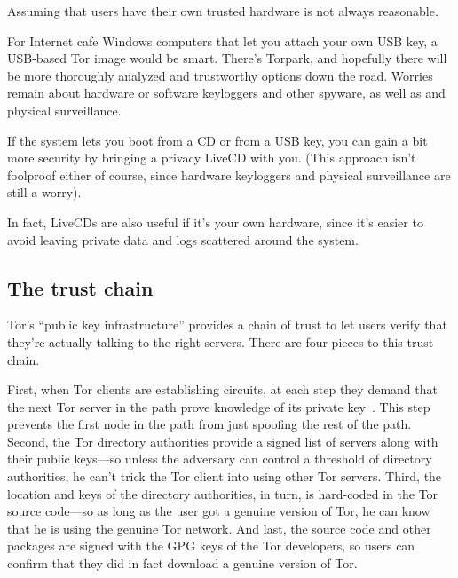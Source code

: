 \documentclass{llncs}
\begin{document}
Assuming that users have their own trusted hardware is not
always reasonable.

For Internet cafe Windows computers that let you attach your own USB key,
a USB-based Tor image would be smart. There's Torpark, and hopefully
there will be more thoroughly analyzed and trustworthy options down the
road. Worries remain about hardware or software keyloggers and other
spyware, as well as and physical surveillance.

If the system lets you boot from a CD or from a USB key, you can gain
a bit more security by bringing a privacy LiveCD with you. (This
approach isn't foolproof either of course, since hardware
keyloggers and physical surveillance are still a worry).

In fact, LiveCDs are also useful if it's your own hardware, since it's
easier to avoid leaving private data and logs scattered around the
system.

%

\subsection{The trust chain}
\label{subsec:trust-chain}

Tor's ``public key infrastructure'' provides a chain of trust to
let users verify that they're actually talking to the right servers.
There are four pieces to this trust chain.

First, when Tor clients are establishing circuits, at each step
they demand that the next Tor server in the path prove knowledge of
its private key~\cite{tor-design}. This step prevents the first node
in the path from just spoofing the rest of the path. Second, the
Tor directory authorities provide a signed list of servers along with
their public keys---so unless the adversary can control a threshold
of directory authorities, he can't trick the Tor client into using other
Tor servers. Third, the location and keys of the directory authorities,
in turn, is hard-coded in the Tor source code---so as long as the user
got a genuine version of Tor, he can know that he is using the genuine
Tor network. And last, the source code and other packages are signed
with the GPG keys of the Tor developers, so users can confirm that they
did in fact download a genuine version of Tor.
\end{document}
